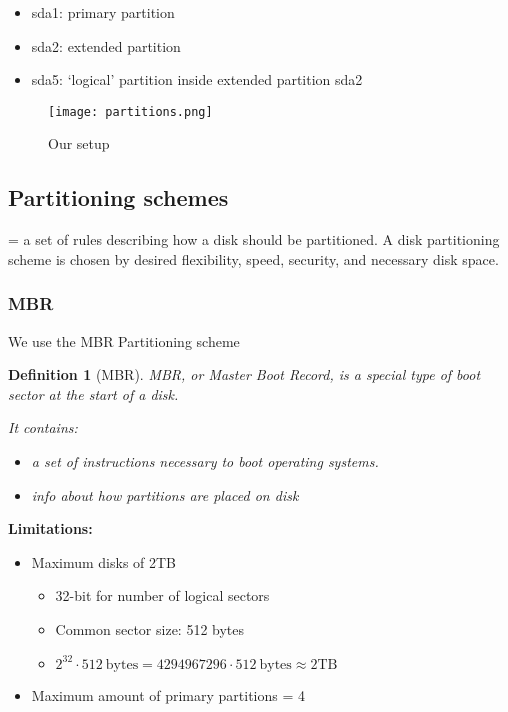 \documentclass{article}
\newtheorem{theorem}{Definition}[section]
\begin{document}
\begin{itemize}
    \item sda1: primary partition
    \item sda2: extended partition
    \item sda5: `logical' partition inside extended partition sda2
\end{itemize}

\begin{figure}[H]
    \centering
    \texttt{[image: partitions.png]}
    \caption{Our setup}
\end{figure}

\subsection{Partitioning schemes}

= a set of rules describing how a disk should be partitioned.
A disk partitioning scheme is chosen by desired flexibility, speed, security, and necessary disk space.

\subsubsection{MBR}

We use the MBR Partitioning scheme

\begin{theorem}[MBR]
MBR, or Master Boot Record, is a special type of boot sector at the start of a disk.

It contains: 

\begin{itemize}
    \item a set of instructions necessary to boot operating systems.
    \item info about how partitions are placed on disk
\end{itemize}


\end{theorem}

\textbf{Limitations:}

\begin{itemize}
    \item Maximum disks of 2TB
    \begin{itemize}
        \item 32-bit for number of logical sectors
        \item Common sector size: 512 bytes
        \item $2^{32} \cdot 512\ \text{bytes} = 4 294 967 296 \cdot 512\ \text{bytes} \approx 2\text{TB}$
    \end{itemize}
    \item Maximum amount of primary partitions = 4
\end{itemize}
\end{document}
